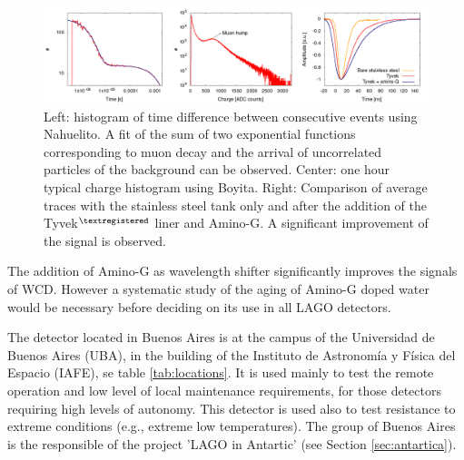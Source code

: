 \begin{figure}[h]
 \begin{center}
\includegraphics[width=\textwidth]{images/argentina/data.png} \caption{Left: histogram
of time difference between consecutive events using Nahuelito. A fit of the sum
of two exponential functions corresponding to muon decay and the arrival of
uncorrelated particles of the background can be observed. Center: one hour
typical charge histogram using Boyita. Right: Comparison of average traces with
the stainless steel tank only and after the addition of the
Tyvek$^{\textregistered}$ liner and Amino-G. A significant improvement of the signal
is observed.} \label{fig:bar-data} 
\end{center}
\end{figure}

The addition of Amino-G as wavelength shifter significantly improves the
signals of WCD. However a systematic study of the aging of Amino-G doped water would be
necessary before deciding on its use in all LAGO detectors.


The detector located in Buenos Aires is at the campus of the Universidad de
Buenos Aires (UBA), in the building of the Instituto de Astronomía y Física del
Espacio (IAFE), se table \ref{tab:locations}. It is used mainly to test the
remote operation and low level of local maintenance requirements, for those
detectors requiring high levels of autonomy. This detector is used also to test
resistance to extreme conditions (e.g., extreme low temperatures).  The group
of Buenos Aires is the responsible of the project 'LAGO in Antartic' (see
Section \ref{sec:antartica}).



